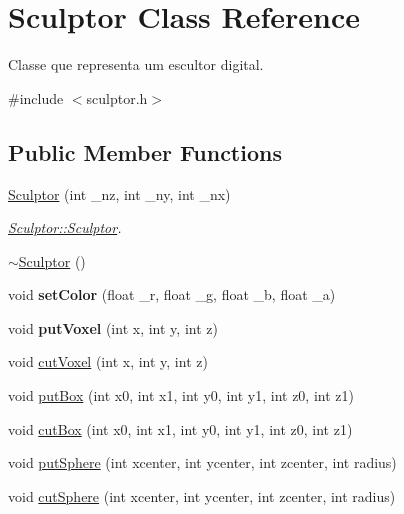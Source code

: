 \hypertarget{classSculptor}{}\section{Sculptor Class Reference}
\label{classSculptor}


Classe que representa um escultor digital.  




{\ttfamily \#include $<$sculptor.\+h$>$}

\subsection*{Public Member Functions}
\begin{DoxyCompactItemize}
\item 
\mbox{\hyperlink{classSculptor_ab03ab031a9cf17099569fbca9758fa0f}{Sculptor}} (int \+\_\+nz, int \+\_\+ny, int \+\_\+nx)
\begin{DoxyCompactList}\small\item\em \mbox{\hyperlink{classSculptor_ab03ab031a9cf17099569fbca9758fa0f}{Sculptor\+::\+Sculptor}}. \end{DoxyCompactList}\item 
\mbox{\hyperlink{classSculptor_a8f159bf97458326f16d2e238e11be7ff}{$\sim$\+Sculptor}} ()
\item 
\mbox{\label{classSculptor_a5723e671e073ac310b6f385a7fdc9f9f}} 
void {\bfseries set\+Color} (float \+\_\+r, float \+\_\+g, float \+\_\+b, float \+\_\+a)
\item 
\mbox{\label{classSculptor_a4bdea3048b419d58e93074060eaa7b52}} 
void {\bfseries put\+Voxel} (int x, int y, int z)
\item 
void \mbox{\hyperlink{classSculptor_ad9d714a35fc8ae16d06eb5df37c3493c}{cut\+Voxel}} (int x, int y, int z)
\item 
void \mbox{\hyperlink{classSculptor_a311ad7a0fb83fc67ac1f378be8e99fe1}{put\+Box}} (int x0, int x1, int y0, int y1, int z0, int z1)
\item 
void \mbox{\hyperlink{classSculptor_aa84a1b12b09e9e103fc8d78f8d1bc00f}{cut\+Box}} (int x0, int x1, int y0, int y1, int z0, int z1)
\item 
void \mbox{\hyperlink{classSculptor_a794a2b6ee8fc8098fd6150cb46101fc6}{put\+Sphere}} (int xcenter, int ycenter, int zcenter, int radius)
\item 
void \mbox{\hyperlink{classSculptor_a67ab8c0ba5116adb8af1d01ad373ac15}{cut\+Sphere}} (int xcenter, int ycenter, int zcenter, int radius)

\end{DoxyCompactItemize}
